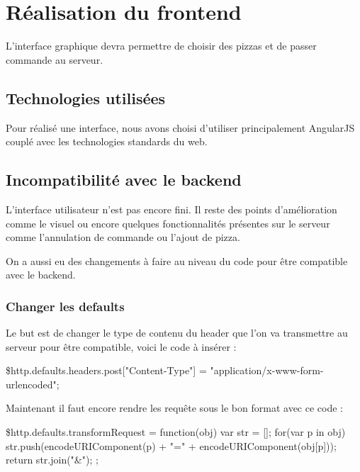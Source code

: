 \section{Réalisation du frontend}
L'interface graphique devra permettre de choisir des pizzas et de passer commande au serveur.

\subsection{Technologies utilisées}

Pour réalisé une interface, nous avons choisi d'utiliser principalement AngularJS couplé avec les technologies standards du web.

\subsection{Incompatibilité avec le backend}
L'interface utilisateur n'est pas encore fini. Il reste des points d'amélioration comme le visuel ou encore quelques fonctionnalités présentes sur le serveur comme l'annulation de commande ou l'ajout de pizza.

On a aussi eu des changements à faire au niveau du code pour être compatible avec le backend.

\subsubsection{Changer les defaults}

Le but est de changer le type de contenu du header que l'on va transmettre au serveur pour être compatible, voici le code à insérer : 

\begin{javascriptcode}
\$http.defaults.headers.post["Content-Type"] = "application/x-www-form-urlencoded";
\end{javascriptcode}

Maintenant il faut encore rendre les requête sous le bon format avec ce code :
\begin{javascriptcode}
 \$http.defaults.transformRequest = function(obj) {
        var str = [];
        for(var p in obj)
            str.push(encodeURIComponent(p) + "=" + encodeURIComponent(obj[p]));
        return str.join("&");
    };
\end{javascriptcode}






